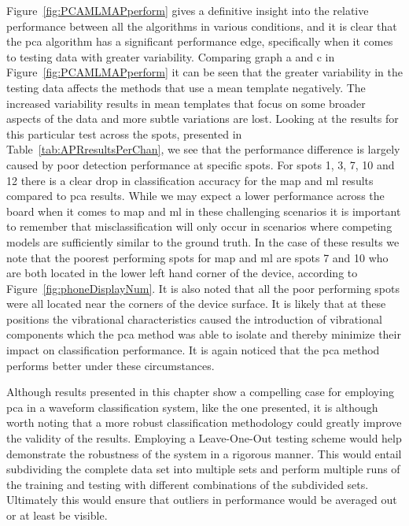 Figure~\ref{fig:PCAMLMAPperform} gives a definitive insight into the relative performance between all the algorithms in various conditions, and it is clear that the \gls{pca} algorithm has a significant performance edge, specifically when it comes to testing data with greater variability. Comparing graph a and c in Figure~\ref{fig:PCAMLMAPperform} it can be seen that the greater variability in the testing data affects the methods that use a mean template negatively. The increased variability results in mean templates that focus on some broader aspects of the data and more subtle variations are lost. Looking at the results for this particular test across the spots, presented in Table~\ref{tab:APRresultsPerChan}, we see that the performance difference is largely caused by poor detection performance at specific spots. For spots 1, 3, 7, 10 and 12 there is a clear drop in classification accuracy for the \gls{map} and \gls{ml} results compared to \gls{pca} results. While we may expect a lower performance across the board when it comes to \gls{map} and \gls{ml} in these challenging scenarios it is important to remember that misclassification will only occur in scenarios where competing models are sufficiently similar to the ground truth. In the case of these results we note that the poorest performing spots for \gls{map} and \gls{ml} are spots 7 and 10 who are both located in the lower left hand corner of the device, according to Figure~\ref{fig:phoneDisplayNum}. It is also noted that all the poor performing spots were all located near the corners of the device surface. It is likely that at these positions the vibrational characteristics caused the introduction of vibrational components which the \gls{pca} method was able to isolate and thereby minimize their impact on classification performance. It is again noticed that the \gls{pca} method performs better under these circumstances.

\label{corrections:LOO}Although results presented in this chapter show a compelling case for employing \gls{pca} in a waveform classification system, like the one presented, it is although worth noting that a more robust classification methodology could greatly improve the validity of the results. Employing a Leave-One-Out testing scheme would help demonstrate the robustness of the system in a rigorous manner. This would entail subdividing the complete data set into multiple sets and perform multiple runs of the training and testing with different combinations of the subdivided sets. Ultimately this would ensure that outliers in performance would be averaged out or at least be visible.

